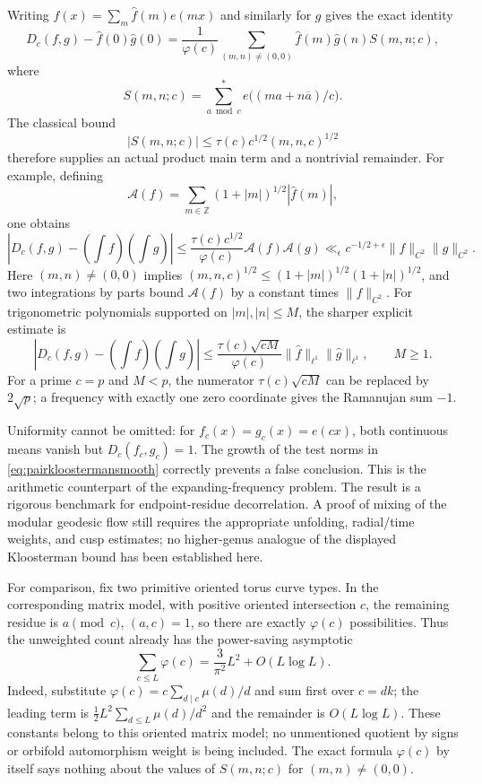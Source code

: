 Writing $f(x)=\sum_m\widehat f(m)e(mx)$ and similarly for $g$ gives the exact
identity
\begin{equation}\label{eq:pairkloosterman}
 D_c(f,g)-\widehat f(0)\widehat g(0)
 =\frac1{\varphi(c)}
   \sum_{(m,n)\ne(0,0)}\widehat f(m)\widehat g(n)S(m,n;c),
\end{equation}
where
\[
 S(m,n;c)=\sum_{a\bmod c}^{*}e\bigl((ma+n\overline a)/c\bigr).
\]
The classical bound \cite[Section~1.1 and equation~(3.2)]{HumphriesModular}
\[
 |S(m,n;c)|\leq\tau(c)c^{1/2}(m,n,c)^{1/2}
\]
therefore supplies an actual product main term and a nontrivial remainder.
For example, defining
\[
 \mathcal A(f)=\sum_{m\in\mathbb Z}(1+|m|)^{1/2}|\widehat f(m)|,
\]
one obtains
\begin{equation}\label{eq:pairkloostermansmooth}
 |D_c(f,g)-(\int f)(\int g)|
 \leq\frac{\tau(c)c^{1/2}}{\varphi(c)}\mathcal A(f)\mathcal A(g)
 \ll_\epsilon c^{-1/2+\epsilon}\|f\|_{C^2}\|g\|_{C^2}.
\end{equation}
Here $(m,n)\ne(0,0)$ implies
$(m,n,c)^{1/2}\leq(1+|m|)^{1/2}(1+|n|)^{1/2}$, and two integrations by
parts bound $\mathcal A(f)$ by a constant times $\|f\|_{C^2}$.
For trigonometric polynomials supported on $|m|,|n|\leq M$, the sharper
explicit estimate is
\[
 |D_c(f,g)-(\int f)(\int g)|
 \leq\frac{\tau(c)\sqrt{cM}}{\varphi(c)}
             \|\widehat f\|_{\ell^1}\|\widehat g\|_{\ell^1},
 \qquad M\geq1.
\]
For a prime $c=p$ and $M<p$, the numerator $\tau(c)\sqrt{cM}$ can be
replaced by $2\sqrt p$; a frequency with exactly one zero coordinate gives
the Ramanujan sum $-1$.

Uniformity cannot be omitted: for $f_c(x)=g_c(x)=e(cx)$, both continuous
means vanish but $D_c(f_c,g_c)=1$.  The growth of the test norms in
\eqref{eq:pairkloostermansmooth} correctly prevents a false conclusion.
This is the arithmetic counterpart of the expanding-frequency problem.
The result is a rigorous benchmark for endpoint-residue decorrelation.  A
proof of mixing of the modular geodesic flow still requires the appropriate
unfolding, radial/time weights, and cusp estimates; no higher-genus analogue
of the displayed Kloosterman bound has been established here.

For comparison, fix two primitive oriented torus curve types.
In the corresponding matrix model, with positive oriented intersection
$c$, the remaining residue is $a\pmod c$, $(a,c)=1$, so there are exactly
$\varphi(c)$ possibilities.  Thus the unweighted count already has the
power-saving asymptotic
\[
 \sum_{c\leq L}\varphi(c)
   =\frac{3}{\pi^2}L^2+O(L\log L).
\]
Indeed, substitute $\varphi(c)=c\sum_{d\mid c}\mu(d)/d$ and sum first over
$c=dk$; the leading term is
$\tfrac12L^2\sum_{d\leq L}\mu(d)/d^2$
and the remainder is $O(L\log L)$.
These constants belong to this oriented matrix model; no unmentioned
quotient by signs or orbifold automorphism weight is being included.
The exact formula $\varphi(c)$ by itself says nothing about the values of
$S(m,n;c)$ for $(m,n)\ne(0,0)$.


